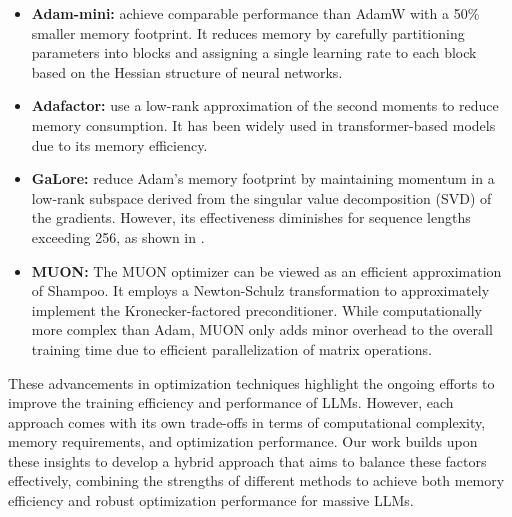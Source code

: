 \begin{itemize}

\item \textbf{Adam-mini:} \citet{zhang2024adam} achieve comparable performance than AdamW with a 50\% smaller memory footprint. It reduces memory by carefully partitioning parameters into blocks and assigning a single learning rate to each block based on the Hessian structure of neural networks. 

\item \textbf{Adafactor:} \citet{shazeer2018adafactor} use a low-rank approximation of the second moments to reduce memory consumption. It has been widely used in transformer-based models due to its memory efficiency.

\item \textbf{GaLore:} \citet{zhao2024galore} reduce Adam's memory footprint by maintaining momentum in a low-rank subspace derived from the singular value decomposition (SVD) of the gradients. However, its effectiveness diminishes for sequence lengths exceeding 256, as shown in \citet{liang2024memory}.

\item \textbf{MUON:} The MUON optimizer \citep{jordan2024MUON} can be viewed as an efficient approximation of Shampoo. It employs a Newton-Schulz transformation to approximately implement the Kronecker-factored preconditioner. While computationally more complex than Adam, MUON only adds minor overhead to the overall training time due to efficient parallelization of matrix operations.

\end{itemize}

These advancements in optimization techniques highlight the ongoing efforts to improve the training efficiency and performance of LLMs. However, each approach comes with its own trade-offs in terms of computational complexity, memory requirements, and optimization performance. Our work builds upon these insights to develop a hybrid approach that aims to balance these factors effectively, combining the strengths of different methods to achieve both memory efficiency and robust optimization performance for massive LLMs.